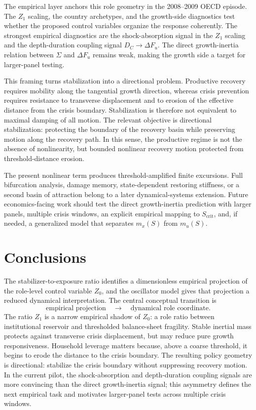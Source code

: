 \documentclass[11pt]{article}
\begin{document}
The empirical layer anchors this role geometry in the 2008--2009 OECD episode. The $Z_1$ scaling, the country archetypes, and the growth-side diagnostics test whether the proposed control variables organize the response coherently. The strongest empirical diagnostics are the shock-absorption signal in the $Z_1$ scaling and the depth-duration coupling signal $D_C\to\Delta F_u$. The direct growth-inertia relation between $\Sigma$ and $\Delta F_u$ remains weak, making the growth side a target for larger-panel testing.

This framing turns stabilization into a directional problem. Productive recovery requires mobility along the tangential growth direction, whereas crisis prevention requires resistance to transverse displacement and to erosion of the effective distance from the crisis boundary. Stabilization is therefore not equivalent to maximal damping of all motion. The relevant objective is directional stabilization: protecting the boundary of the recovery basin while preserving motion along the recovery path. In this sense, the productive regime is not the absence of nonlinearity, but bounded nonlinear recovery motion protected from threshold-distance erosion.

The present nonlinear term produces threshold-amplified finite excursions. Full bifurcation analysis, damage memory, state-dependent restoring stiffness, or a second basin of attraction belong to a later dynamical-systems extension. Future economics-facing work should test the direct growth-inertia prediction with larger panels, multiple crisis windows, an explicit empirical mapping to $S_{\mathrm{crit}}$, and, if needed, a generalized model that separates $m_x(S)$ from $m_u(S)$.

\section{Conclusions}
The stabilizer-to-exposure ratio identifies a dimensionless empirical projection of the role-level control variable $Z_0$, and the oscillator model gives that projection a reduced dynamical interpretation. The central conceptual transition is
\[
\text{empirical projection}\quad\rightarrow\quad\text{dynamical role coordinate}.
\]
The ratio $Z_1$ is a narrow empirical shadow of $Z_0$: a role ratio between institutional reservoir and thresholded balance-sheet fragility. Stable inertial mass protects against transverse crisis displacement, but may reduce pure growth responsiveness. Household leverage matters because, above a coarse threshold, it begins to erode the distance to the crisis boundary. The resulting policy geometry is directional: stabilize the crisis boundary without suppressing recovery motion. In the current pilot, the shock-absorption and depth-duration coupling signals are more convincing than the direct growth-inertia signal; this asymmetry defines the next empirical task and motivates larger-panel tests across multiple crisis windows.
\end{document}
